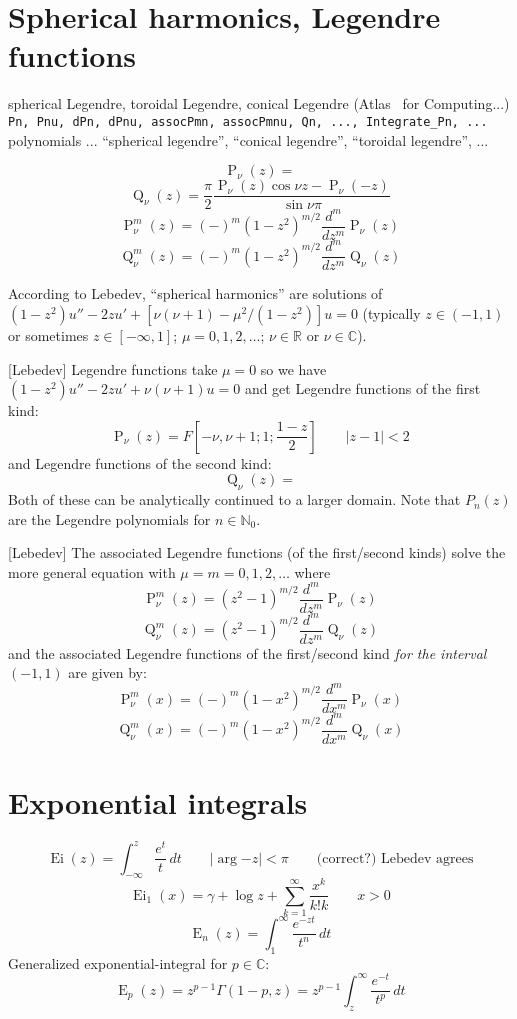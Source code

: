 \documentclass[10pt,dvipdfmx,letterpaper,twoside]{article}
\let\O=\operatorname
\newcommand{\RR}{{\mathbb{R}}}
\newcommand{\CC}{{\mathbb{C}}}
\newcommand{\NNo}{{\mathbb{N}_0}}
\let\gam=\gamma
\let\Gam=\Gamma
\begin{document}
\section{Spherical harmonics, Legendre functions}
spherical Legendre, toroidal Legendre, conical Legendre (Atlas~\cite{atlas:thompson} for Computing...)
{\tt Pn, Pnu, dPn, dPnu, assocPmn, assocPmnu, Qn, ..., Integrate\_Pn, ...} polynomials ...
``spherical legendre'', ``conical legendre'', ``toroidal legendre'', ...

\[ \O{P}_\nu(z) = \]
\[ \O{Q}_\nu(z) = \frac{\pi}{2} \frac{\O{P}_\nu(z) \cos\nu z - \O{P}_\nu(-z)}{\sin \nu\pi} \]
\[ \O{P}^m_\nu(z) = (-)^m(1-z^2)^{m/2} \frac{d^m}{dz^m} \O{P}_\nu(z) \]
\[ \O{Q}^m_\nu(z) = (-)^m(1-z^2)^{m/2} \frac{d^m}{dz^m} \O{Q}_\nu(z) \]

According to Lebedev, ``spherical harmonics'' are solutions of $(1-z^2)u'' - 2zu' + [\nu(\nu+1)-\mu^2/(1-z^2)]u = 0$
(typically $z\in(-1,1)$ or sometimes $z\in[-\infty,1]$; $\mu=0,1,2,\dots$; $\nu\in\RR$ or $\nu\in\CC$).

[Lebedev] Legendre functions take $\mu=0$ so we have $(1-z^2)u'' - 2zu' + \nu(\nu+1)u = 0$ and get
Legendre functions of the first kind:
\[ \O{P}_\nu(z) = F[-\nu,\nu+1; 1; \frac{1-z}{2}]  \qquad|z-1|<2 \]
and Legendre functions of the second kind:
\[ \O{Q}_\nu(z) = \]
Both of these can be analytically continued to a larger domain.  Note that $P_n(z)$ are the Legendre polynomials for $n\in\NNo$.

[Lebedev] The associated Legendre functions (of the first/second kinds) solve the more general equation with $\mu=m=0,1,2,\dots$
where
\[ \O{P}^m_\nu(z) = (z^2-1)^{m/2} \frac{d^m}{dz^m} \O{P}_\nu(z) \]
\[ \O{Q}^m_\nu(z) = (z^2-1)^{m/2} \frac{d^m}{dz^m} \O{Q}_\nu(z) \]
and the associated Legendre functions of the first/second kind {\em for the interval $(-1,1)$} are given by:
\[ \O{P}^m_\nu(x) = (-)^m(1-x^2)^{m/2} \frac{d^m}{dx^m} \O{P}_\nu(x) \]
\[ \O{Q}^m_\nu(x) = (-)^m(1-x^2)^{m/2} \frac{d^m}{dx^m} \O{Q}_\nu(x) \]

\section{Exponential integrals}

\[ \O{Ei}(z) = \int_{-\infty}^z \frac{e^t}{t}\,dt  \qquad|\arg {-z}|<\pi  \qquad\text{(correct?) Lebedev agrees}\]
\[ \O{Ei}_1(x) = \gam + \log z + \sum_{k=1}^\infty \frac{x^k}{k! k} \qquad x>0\]
\[ \O{E}_n(z) = \int_1^\infty\frac{e^{-zt}}{t^n}\,dt \]
Generalized exponential-integral for $p\in\CC$:
\[ \O{E}_p(z) = z^{p-1}\Gam(1-p,z) = z^{p-1}\int_z^\infty\frac{e^{-t}}{t^p}\,dt \]
\end{document}
